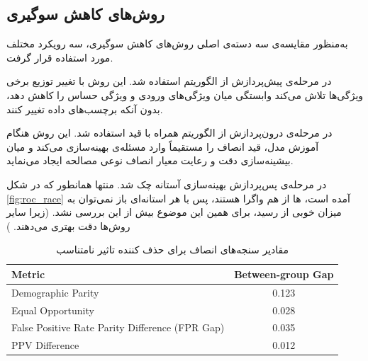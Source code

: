 \subsection{روش‌های کاهش سوگیری}

به‌منظور مقایسه‌ی سه دسته‌ی اصلی روش‌های کاهش سوگیری، سه رویکرد مختلف مورد استفاده قرار گرفت.

در مرحله‌ی پیش‌پردازش از الگوریتم  استفاده شد. این روش با تغییر توزیع برخی ویژگی‌ها تلاش می‌کند وابستگی میان ویژگی‌های ورودی و ویژگی حساس را کاهش دهد، بدون آنکه برچسب‌های داده تغییر کنند.

در مرحله‌ی درون‌پردازش از الگوریتم  همراه با قید  استفاده شد. این روش هنگام آموزش مدل، قید انصاف را مستقیماً وارد مسئله‌ی بهینه‌سازی می‌کند و میان بیشینه‌سازی دقت و رعایت معیار انصاف نوعی مصالحه ایجاد می‌نماید.

در مرحله‌ی پس‌پردازش  بهینه‌سازی آستانه چک شد. منتها همانطور که در شکل 
\ref{fig:roc_race}
آمده است، 
ها از هم واگرا هستند، پس با هر استانه‌ای باز نمی‌توان به میزان خوبی از 
رسید، برای همین این موضوع بیش از این بررسی نشد. (زیرا سایر روش‌ها دقت بهتری می‌دهند. )

\begin{table}[H]
	\centering
	\caption{مقادیر سنجه‌های انصاف برای حذف کننده تاثیر نامتناسب}
	\label{tab:fairness_dir}
	
	\begin{latin}
		\begin{tabular}{|lc|}
			\hline
			\textbf{Metric} & \textbf{Between-group Gap} \\
			\hline

			Demographic Parity & 0.123 \\

			Equal Opportunity & 0.028 \\

			False Positive Rate Parity Difference (FPR Gap) & 0.035 \\

			PPV Difference & 0.012 \\
			\hline
		\end{tabular}
	\end{latin}
	
\end{table}

